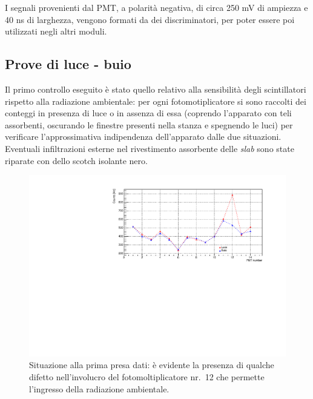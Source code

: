 \documentclass[11pt, oneside, a4paper]{article}   	%
\begin{document}
I segnali provenienti dal PMT, a polarità negativa, di circa 250 mV di ampiezza e 40 ns di larghezza, vengono formati da dei discriminatori, per poter essere poi utilizzati negli altri moduli.
%
%
\subsection{Prove di luce - buio}
Il primo controllo eseguito è stato quello relativo alla sensibilità degli scintillatori rispetto alla radiazione ambientale: per ogni fotomotiplicatore si sono raccolti dei conteggi in presenza di luce o in assenza di essa (coprendo l'apparato con teli assorbenti, oscurando le finestre presenti nella stanza e spegnendo le luci) per verificare l'approssimativa indipendenza dell'apparato dalle due situazioni. Eventuali infiltrazioni esterne nel rivestimento assorbente delle \emph{slab} sono state riparate con dello scotch isolante nero. 
%
\begin{figure}[h]
	\centering
	\includegraphics[scale=0.6]{img/luce_buio_100s.pdf}
	\caption{Situazione alla prima presa dati: è evidente la presenza di qualche difetto  nell'involucro del fotomoltiplicatore nr.~12 che permette l'ingresso della radiazione ambientale.}
\end{figure}
%
\end{document}
